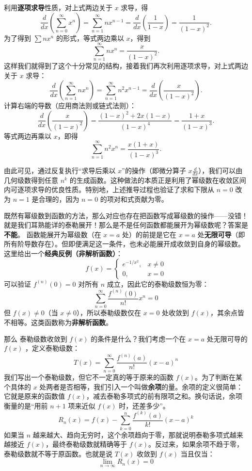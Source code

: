 \documentclass[UTF8]{ctexbook}
\begin{document}
利用\textbf{逐项求导}性质，对上式两边关于 $x$ 求导，得
\[
    \frac{d}{dx}\left( \sum_{n=0}^{\infty} x^n \right)
    = \sum_{n=1}^{\infty} n x^{n-1}
    = \frac{d}{dx}\left( \frac{1}{1-x} \right)
    = \frac{1}{(1-x)^2}.
\]
为了得到 $\sum n x^n$ 的形式，等式两边乘以 $x$，得到
\[
    \sum_{n=1}^{\infty} n x^{n} = \frac{x}{(1-x)^2}. 
\]
这样我们就得到了这个十分常见的结构，接着我们再次利用逐项求导，对上式两边关于 $x$ 求导：
\[
    \frac{d}{dx}\left( \sum_{n=1}^{\infty} n x^{n} \right)
    = \sum_{n=1}^{\infty} n^2 x^{n-1}
    = \frac{d}{dx}\left( \frac{x}{(1-x)^2} \right).
\]
计算右端的导数（应用商法则或链式法则）：
\[
    \frac{d}{dx}\left( \frac{x}{(1-x)^2} \right)
    = \frac{(1-x)^2 + 2x(1-x)}{(1-x)^4}
    = \frac{1+x}{(1-x)^3}.
\]
等式两边再乘以 $x$，即得
\[
    \sum_{n=1}^{\infty} n^2 x^{n} = \frac{x(1+x)}{(1-x)^3}. 
\]

由此可见，通过反复执行“求导后乘以 $x$”的操作（即微分算子 $x\frac{d}{dx}$），我们可以由几何级数得到任意 $n^k$ 的生成函数。这种做法的本质正是利用了幂级数在收敛区间内可逐项求导的优良性质。特别地，上述推导过程也验证了求和下限从 $n=0$ 改为 $n=1$ 是合理的，因为 $n=0$ 的项对和式贡献为零。

既然有幂级数到函数的方法，那么对应也存在把函数写成幂级数的操作——没错！就是我们耳熟能详的泰勒展开！那么是不是任何函数都能展开为幂级数呢？答案是\textbf{不能}。 函数能展开为幂级数（在 $x=a$ 处）的前提是它在 $x=a$ 处\textbf{无限可导}（即所有阶导数存在）。但即便满足这一条件，也未必能展开成收敛到自身的幂级数。这里给出一个\textbf{经典反例（非解析函数）}：
\[
f(x) = 
\begin{cases}
e^{-1/x^2}, & x \neq 0 \\
0, & x = 0
\end{cases}
\]
可以验证 $f^{(n)}(0)=0$ 对所有 $n$ 成立，因此它的泰勒级数恒为零：
\[
\sum_{n=0}^{\infty} \frac{f^{(n)}(0)}{n!} x^n = 0
\]
但 $f(x) \neq 0$（当 $x \neq 0$），所以泰勒级数仅在 $x=0$ 处收敛到 $f(x)$，其余点皆不相等。这类函数称为\textbf{非解析函数}。

那么 泰勒级数收敛到 $f(x)$ 的条件是什么？我们考虑一个在 $x=a$ 处无限可导的 $f(x)$ ，定义泰勒级数：
\[
T(x) = \sum_{n=0}^{\infty} \frac{f^{(n)}(a)}{n!} (x-a)^n
\]
我们写出一个泰勒级数，但它不一定真的等于原来的函数 $f(x)$。为了判断在某个具体的 $x$ 处两者是否相等，我们引入一个叫做\textbf{余项}的量。余项的定义很简单：它就是原来的函数值 $f(x)$，减去泰勒多项式的前有限项之和。换句话说，余项衡量的是“用前 $n+1$ 项来近似 $f(x)$ 时，还差多少”。
\[
R_n(x) = f(x) - \sum_{k=0}^{n} \frac{f^{(k)}(a)}{k!} (x-a)^k
\]
如果当 $n$ 越来越大、趋向无穷时，这个余项趋向于零，那就说明泰勒多项式越来越接近 $f(x)$，最终泰勒级数就精确等于 $f(x)$。反过来，如果余项不趋于零，泰勒级数就不等于原函数。也就是说 $T(x)$ 收敛到 $f(x)$ 当且仅当：
\[
\boxed{\lim_{n\to\infty} R_n(x) = 0}
\]
\end{document}
